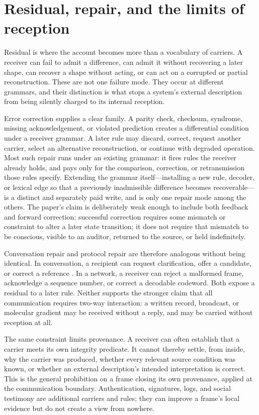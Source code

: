 \documentclass[11pt,a4paper]{article}
\theoremstyle{remark}\newtheorem{remark}[definition]{Remark}
\begin{document}
\section{Residual, repair, and the limits of reception}\label{sec:repair}

Residual is where the account becomes more than a vocabulary of carriers. A
receiver can fail to admit a difference, can admit it without recovering a later
shape, can recover a shape without acting, or can act on a corrupted or partial
reconstruction. These are not one failure mode. They occur at different grammars,
and their distinction is what stops a system's external description from being
silently charged to its internal reception.

Error correction supplies a clear family. A parity check, checksum, syndrome,
missing acknowledgement, or violated prediction creates a differential condition
under a receiver grammar. A later rule may discard, correct, request another
carrier, select an alternative reconstruction, or continue with degraded
operation. Most such repair runs under an existing grammar: it fires rules the
receiver already holds, and pays only for the comparison, correction, or
retransmission those rules specify. Extending the grammar itself---installing a
new rule, decoder, or lexical edge so that a previously inadmissible difference
becomes recoverable---is a distinct and separately paid write, and is only one
repair mode among the others. The paper's claim is deliberately weak enough to
include both
feedback and forward correction: successful correction requires some mismatch or
constraint to alter a later state transition; it does not require that mismatch to
be conscious, visible to an auditor, returned to the source, or held indefinitely.

Conversation repair and protocol repair are therefore analogous without being
identical. In conversation, a recipient can request clarification, offer a
candidate, or correct a reference \citep{clark1996,clarkwilkesgibbs1986}. In a
network, a receiver can reject a malformed frame, acknowledge a sequence number,
or correct a decodable codeword. Both expose a residual to a later rule. Neither
supports the stronger claim that all communication requires two-way interaction:
a written record, broadcast, or molecular gradient may be received without a
reply, and may be carried without reception at all.

The same constraint limits provenance. A receiver can often establish that a
carrier meets its own integrity predicate. It cannot thereby settle, from inside,
why the carrier was produced, whether every relevant source condition was known,
or whether an external description's intended interpretation is correct. This is
the general prohibition on a frame closing its own provenance, applied at the
communication boundary. Authentication, signatures, logs, and social testimony
are additional carriers and rules; they can improve a frame's local evidence but
do not create a view from nowhere.
\end{document}
